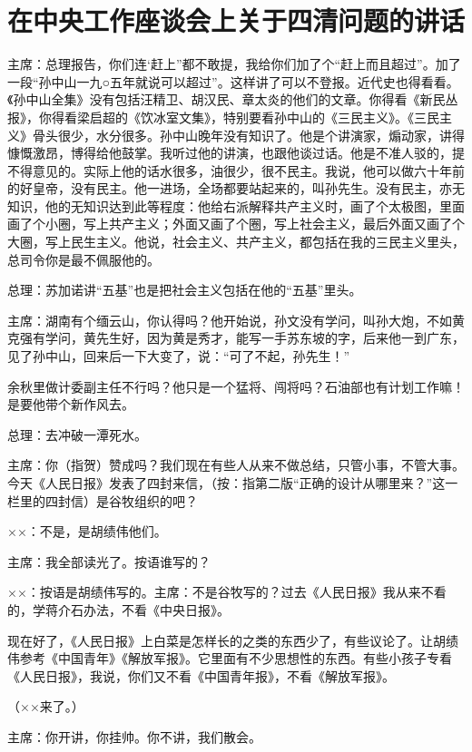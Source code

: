 \section[在中央工作座谈会上关于四清问题的讲话（一九六四年十二月二十日）]{在中央工作座谈会上关于四清问题的讲话}


主席：总理报告，你们连‘赶上”都不敢提，我给你们加了个“赶上而且超过”。加了一段“孙中山一九○五年就说可以超过”。这样讲了可以不登报。近代史也得看看。《孙中山全集》没有包括汪精卫、胡汉民、章太炎的他们的文章。你得看《新民丛报》，你得看梁启超的《饮冰室文集》，特别要看孙中山的《三民主义》。《三民主义》骨头很少，水分很多。孙中山晚年没有知识了。他是个讲演家，煽动家，讲得慷慨激昂，博得给他鼓掌。我听过他的讲演，也跟他谈过话。他是不准人驳的，提不得意见的。实际上他的话水很多，油很少，很不民主。我说，他可以做六十年前的好皇帝，没有民主。他一进场，全场都要站起来的，叫孙先生。没有民主，亦无知识，他的无知识达到此等程度：他给右派解释共产主义时，画了个太极图，里面画了个小圈，写上共产主义；外面又画了个圈，写上社会主义，最后外面又画了个大圈，写上民生主义。他说，社会主义、共产主义，都包括在我的三民主义里头，总司令你是最不佩服他的。

总理：苏加诺讲“五基”也是把社会主义包括在他的“五基”里头。

主席：湖南有个缅云山，你认得吗？他开始说，孙文没有学问，叫孙大炮，不如黄克强有学问，黄先生好，因为黄是秀才，能写一手苏东坡的字，后来他一到广东，见了孙中山，回来后一下大变了，说：“可了不起，孙先生！”

余秋里做计委副主任不行吗？他只是一个猛将、闯将吗？石油部也有计划工作嘛！是要他带个新作风去。

总理：去冲破一潭死水。

主席：你（指贺）赞成吗？我们现在有些人从来不做总结，只管小事，不管大事。今天《人民日报》发表了四封来信，（按：指第二版“正确的设计从哪里来？”这一栏里的四封信）是谷牧组织的吧？

××：不是，是胡绩伟他们。

主席：我全部读光了。按语谁写的？

××：按语是胡绩伟写的。主席：不是谷牧写的？过去《人民日报》我从来不看的，学蒋介石办法，不看《中央日报》。

现在好了，《人民日报》上白菜是怎样长的之类的东西少了，有些议论了。让胡绩伟参考《中国青年》《解放军报》。它里面有不少思想性的东西。有些小孩子专看《人民日报》，我说，你们又不看《中国青年报》，不看《解放军报》。

（××来了。）

主席：你开讲，你挂帅。你不讲，我们散会。

